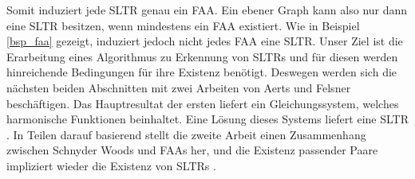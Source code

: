 Somit induziert jede SLTR genau ein FAA. Ein ebener Graph kann also nur dann eine SLTR besitzen, wenn mindestens ein FAA existiert. Wie in Beispiel \ref{bsp_faa} gezeigt, induziert jedoch nicht jedes FAA eine SLTR. Unser Ziel ist die Erarbeitung eines Algorithmus zu Erkennung von SLTRs und für diesen werden hinreichende Bedingungen für ihre Existenz benötigt. Deswegen werden sich die nächsten beiden Abschnitten mit zwei Arbeiten von Aerts und Felsner beschäftigen. Das Hauptresultat der ersten liefert ein Gleichungssystem, welches harmonische Funktionen beinhaltet. Eine Lösung dieses Systems liefert eine SLTR \cite{af13}. In Teilen darauf basierend stellt die zweite Arbeit einen Zusammenhang zwischen Schnyder Woods und FAAs her, und die Existenz passender Paare impliziert wieder die Existenz von SLTRs \cite{af15}.



